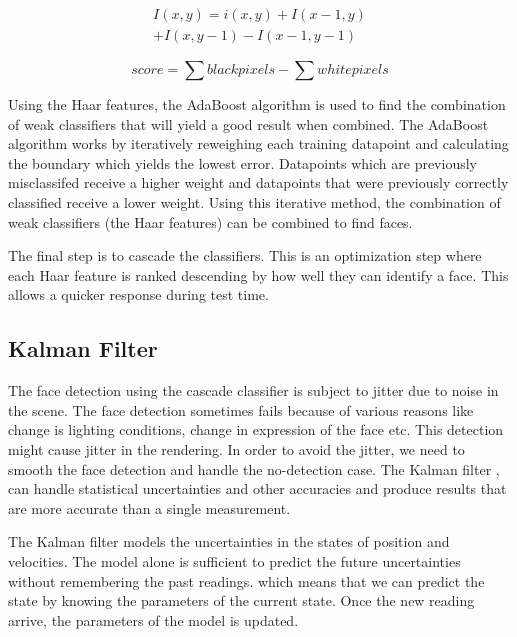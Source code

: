 \documentclass[12pt,twocolumn,letterpaper]{article}
\begin{document}
\begin{multline}
\label{eqn:integral}
I(x,y) =  i(x,y) + I(x-1,y) 
\\+ I(x, y-1) - I(x-1, y-1)
\end{multline}


\textbf{\begin{equation}
\label{eqn:haar}
score = \sum{black pixels} - \sum{white pixels}
\end{equation}}

Using the Haar features, the AdaBoost algorithm is used to find the combination of weak classifiers that will yield a good result when combined.  The AdaBoost algorithm works by iteratively reweighing each training datapoint and calculating the boundary which yields the lowest error.  Datapoints which are previously misclassifed receive a higher weight and datapoints that were previously correctly classified receive a lower weight.  Using this iterative method, the combination of weak classifiers (the Haar features) can be combined to find faces.

The final step is to cascade the classifiers.  This is an optimization step where each Haar feature is ranked descending by how well they can identify a face.  This allows a quicker response during test time. 

\subsection{Kalman Filter}
The face detection using the cascade classifier is subject to jitter due to noise in the scene. The face detection sometimes fails because of various reasons like change is lighting conditions, change in expression of the face etc. This detection might cause jitter in the rendering. In order to avoid the jitter, we need to smooth the face detection and handle the no-detection case. The Kalman filter \cite{kalman}, can handle statistical uncertainties and other accuracies and produce results that are more accurate than a single measurement.

The Kalman filter models the uncertainties  in the states of position and velocities. The model alone is sufficient to predict the future uncertainties without remembering the past readings. which means that we can predict the state by knowing the parameters of the current state. Once the new reading arrive, the parameters of the model is updated.
\end{document}
